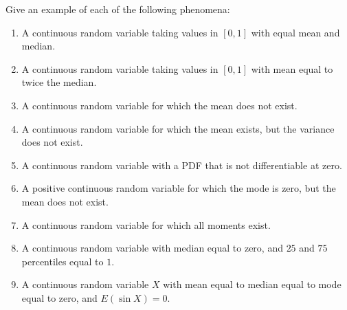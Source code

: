 \begin{problem}[Handout 13, \# 16]
  Give an example of each of the following phenomena:
  \begin{enumerate}[label=(\alph*),noitemsep]
  \item A continuous random variable taking values in \([0,1]\) with equal
    mean and median.
  \item A continuous random variable taking values in \([0,1]\) with mean
    equal to twice the median.
  \item A continuous random variable for which the mean does not exist.
  \item A continuous random variable for which the mean exists, but the
    variance does not exist.
  \item A continuous random variable with a PDF that is not differentiable
    at zero.
  \item A positive continuous random variable for which the mode is zero,
    but the mean does not exist.
  \item A continuous random variable for which all moments exist.
  \item A continuous random variable with median equal to zero, and
    \(25\) and \(75\) percentiles equal to \(1\).
  \item A continuous random variable \(X\) with mean equal to median equal
    to mode equal to zero, and \(E(\sin X)=0\).
  \end{enumerate}
\end{problem}
